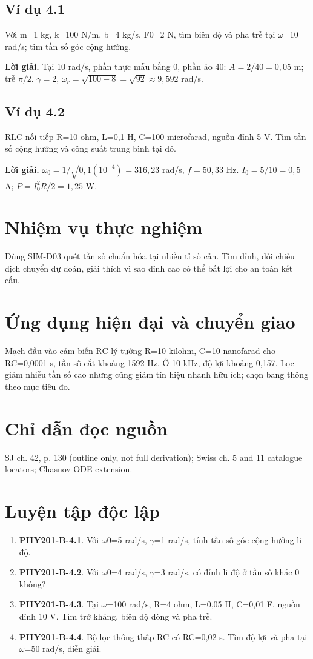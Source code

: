 \documentclass[11pt,a4paper,openany]{book}
\begin{document}
\subsection*{Ví dụ 4.1}
Với m=1 kg, k=100 N/m, b=4 kg/s, F0=2 N, tìm biên độ và pha trễ tại \ensuremath{\omega}=10 rad/s; tìm tần số góc cộng hưởng.

\textbf{Lời giải.} Tại 10 rad/s, phần thực mẫu bằng 0, phần ảo 40: $A=2/40=0{,}05$ m; trễ $\pi/2$. $\gamma=2$, $\omega_r=\sqrt{100-8}=\sqrt{92}\approx9{,}592$ rad/s.
\subsection*{Ví dụ 4.2}
RLC nối tiếp R=10 ohm, L=0,1 H, C=100 microfarad, nguồn đỉnh 5 V. Tìm tần số cộng hưởng và công suất trung bình tại đó.

\textbf{Lời giải.} $\omega_0=1/\sqrt{0{,}1(10^{-4})}=316{,}23$ rad/s, $f=50{,}33$ Hz. $I_0=5/10=0{,}5$ A; $P=I_0^2R/2=1{,}25$ W.
\section{Nhiệm vụ thực nghiệm}
Dùng SIM-D03 quét tần số chuẩn hóa tại nhiều tỉ số cản. Tìm đỉnh, đối chiếu dịch chuyển dự đoán, giải thích vì sao đỉnh cao có thể bất lợi cho an toàn kết cấu.
\section{Ứng dụng hiện đại và chuyển giao}
Mạch đầu vào cảm biến RC lý tưởng R=10 kilohm, C=10 nanofarad cho RC=0,0001 s, tần số cắt khoảng 1592 Hz. Ở 10 kHz, độ lợi khoảng 0,157. Lọc giảm nhiễu tần số cao nhưng cũng giảm tín hiệu nhanh hữu ích; chọn băng thông theo mục tiêu đo.
\section{Chỉ dẫn đọc nguồn}
SJ ch. 42, p. 130 (outline only, not full derivation); Swiss ch. 5 and 11 catalogue locators; Chasnov ODE extension.
\section{Luyện tập độc lập}
\begin{enumerate}
\item \textbf{PHY201-B-4.1}. Với \ensuremath{\omega}0=5 rad/s, \ensuremath{\gamma}=1 rad/s, tính tần số góc cộng hưởng li độ.
\item \textbf{PHY201-B-4.2}. Với \ensuremath{\omega}0=4 rad/s, \ensuremath{\gamma}=3 rad/s, có đỉnh li độ ở tần số khác 0 không?
\item \textbf{PHY201-B-4.3}. Tại \ensuremath{\omega}=100 rad/s, R=4 ohm, L=0,05 H, C=0,01 F, nguồn đỉnh 10 V. Tìm trở kháng, biên độ dòng và pha trễ.
\item \textbf{PHY201-B-4.4}. Bộ lọc thông thấp RC có RC=0,02 s. Tìm độ lợi và pha tại \ensuremath{\omega}=50 rad/s, diễn giải.
\end{enumerate}
\end{document}
